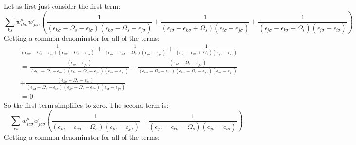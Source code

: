 \documentclass[12pt]{article}
\begin{document}
Let as first just consider the first term:
\begin{equation}
\sum_{ks} w_{i k \sigma}^s w_{j k \sigma}^s \left( \frac{1}{(\epsilon_{k \sigma} - \Omega_s - \epsilon_{i \sigma})(\epsilon_{k \sigma} - \Omega_s - \epsilon_{j \sigma})} + \frac{1}{(\epsilon_{i \sigma} - \epsilon_{k \sigma} + \Omega_s)(\epsilon_{i \sigma} - \epsilon_{j \sigma})} + \frac{1}{(\epsilon_{j \sigma} - \epsilon_{k \sigma} + \Omega_s)(\epsilon_{j \sigma} - \epsilon_{i \sigma})} \right)
\end{equation}
Getting a common denominator for all of the terms:
\begin{equation}
\begin{aligned}
& \frac{1}{(\epsilon_{k \sigma} - \Omega_s - \epsilon_{i \sigma})(\epsilon_{k \sigma} - \Omega_s - \epsilon_{j \sigma})} + \frac{1}{(\epsilon_{i \sigma} - \epsilon_{k \sigma} + \Omega_s)(\epsilon_{i \sigma} - \epsilon_{j \sigma})} + \frac{1}{(\epsilon_{j \sigma} - \epsilon_{k \sigma} + \Omega_s)(\epsilon_{j \sigma} - \epsilon_{i \sigma})} \\
& = \frac{\left( \epsilon_{i\sigma } - \epsilon_{j\sigma } \right)}{\left(\epsilon_{k\sigma } - \Omega _s - \epsilon_{i\sigma }\right)\left(\epsilon_{k\sigma } - \Omega _s - \epsilon_{j\sigma }\right)\left(\epsilon_{i\sigma } - \epsilon_{j\sigma }\right)} - \frac{\left( \epsilon_{k\sigma } - \Omega _s - \epsilon_{j\sigma } \right)}{\left(\epsilon_{k\sigma } - \Omega _s - \epsilon_{i\sigma }\right)\left(\epsilon_{k\sigma } - \Omega _s - \epsilon_{j\sigma }\right)\left(\epsilon_{i\sigma } - \epsilon_{j\sigma }\right)}\\
& + \frac{\left( \epsilon_{k\sigma } - \Omega _s - \epsilon_{i\sigma } \right)}{\left(\epsilon_{k\sigma } - \Omega _s - \epsilon_{i\sigma }\right)\left(\epsilon_{k\sigma } - \Omega _s - \epsilon_{j\sigma }\right)\left(\epsilon_{i\sigma } - \epsilon_{j\sigma }\right)} \\
&=0
\end{aligned}
\end{equation}
So the first term simplifies to zero. The second term is:
\begin{equation}
\sum_{cs} w_{i c \sigma}^s w_{j c \sigma}^s \left( \frac{1}{(\epsilon_{i \sigma} - \epsilon_{c \sigma} - \Omega_s)(\epsilon_{i \sigma} - \epsilon_{j \sigma})} + \frac{1}{(\epsilon_{j \sigma} - \epsilon_{c \sigma} - \Omega_s)(\epsilon_{j \sigma} - \epsilon_{i \sigma})} \right)
\end{equation}
Getting a common denominator for all of the terms:
\end{document}
